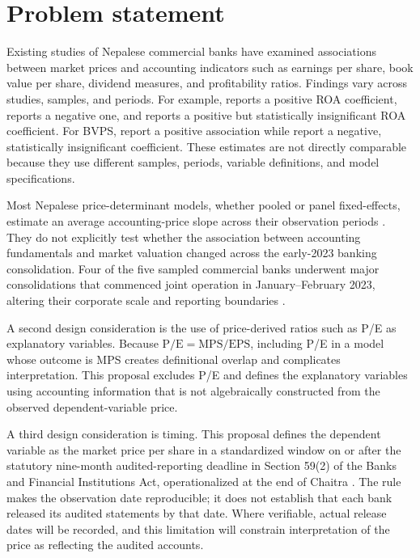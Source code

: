 \section{Problem statement}

Existing studies of Nepalese commercial banks have examined associations between
market prices and accounting indicators such as earnings per share, book value
per share, dividend measures, and profitability ratios. Findings vary across
studies, samples, and periods. For example, \citet{chhetri2023} reports a
positive ROA coefficient, \citet{chaudhari2025} reports a negative one, and
\citet{gyawali2022} reports a positive but statistically insignificant ROA
coefficient. For BVPS, \citet{joshi2023} report a positive association while
\citet{pant2024} report a negative, statistically insignificant coefficient.
These estimates are not directly comparable because they use different samples,
periods, variable definitions, and model specifications.

Most Nepalese price-determinant models, whether pooled or panel fixed-effects,
estimate an average accounting-price slope across their observation periods
\citep{chhetri2023,gurungdahal2025,bhattarai2024mps}. They do not explicitly
test whether the association between accounting fundamentals and market
valuation changed across the early-2023 banking consolidation. Four of the five
sampled commercial banks underwent major consolidations that commenced joint
operation in January--February 2023, altering their corporate scale and
reporting boundaries
\citep{gbime2022agm,hbl2023report,kumari2022sgm,nimb2023report}.

A second design consideration is the use of price-derived ratios such as P/E as
explanatory variables. Because $\text{P/E}=\text{MPS}/\text{EPS}$, including
P/E in a model whose outcome is MPS creates definitional overlap and
complicates interpretation. This proposal excludes P/E and defines the
explanatory variables using accounting information that is not algebraically
constructed from the observed dependent-variable price.

A third design consideration is timing. This proposal defines the dependent
variable as the market price per share in a standardized window on or after the
statutory nine-month audited-reporting deadline in Section 59(2) of the Banks
and Financial Institutions Act, operationalized at the end of Chaitra
\citep{bafia2017}. The rule makes the observation date reproducible; it does
not establish that each bank released its audited statements by that date.
Where verifiable, actual release dates will be recorded, and this limitation
will constrain interpretation of the price as reflecting the audited accounts.

